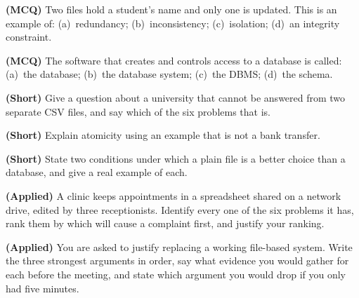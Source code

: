 \begin{reviewq}
  \item \textbf{(MCQ)} Two files hold a student's name and only one is updated.
        This is an example of: (a)~redundancy; (b)~inconsistency; (c)~isolation;
        (d)~an integrity constraint.
  \item \textbf{(MCQ)} The software that creates and controls access to a
        database is called: (a)~the database; (b)~the database system; (c)~the
        DBMS; (d)~the schema.
  \item \textbf{(Short)} Give a question about a university that cannot be
        answered from two separate CSV files, and say which of the six problems
        that is.
  \item \textbf{(Short)} Explain atomicity using an example that is not a bank
        transfer.
  \item \textbf{(Short)} State two conditions under which a plain file is a
        better choice than a database, and give a real example of each.
  \item \textbf{(Applied)} A clinic keeps appointments in a spreadsheet shared
        on a network drive, edited by three receptionists. Identify every one of
        the six problems it has, rank them by which will cause a complaint
        first, and justify your ranking.
  \item \textbf{(Applied)} You are asked to justify replacing a working
        file-based system. Write the three strongest arguments in order, say
        what evidence you would gather for each before the meeting, and state
        which argument you would drop if you only had five minutes.
\end{reviewq}
